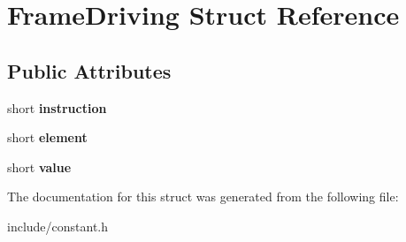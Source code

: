 \hypertarget{struct_frame_driving}{\section{\-Frame\-Driving \-Struct \-Reference}
\label{struct_frame_driving}
}
\subsection*{\-Public \-Attributes}
\begin{DoxyCompactItemize}
\item 
\hypertarget{struct_frame_driving_a4c0985fb401c923c8d3b526f69e7deb2}{short {\bfseries instruction}}\label{struct_frame_driving_a4c0985fb401c923c8d3b526f69e7deb2}

\item 
\hypertarget{struct_frame_driving_a669756480168eab7241bb8aabc6cd11a}{short {\bfseries element}}\label{struct_frame_driving_a669756480168eab7241bb8aabc6cd11a}

\item 
\hypertarget{struct_frame_driving_ae4c84259e78022daf4ef1bdaa0328b3c}{short {\bfseries value}}\label{struct_frame_driving_ae4c84259e78022daf4ef1bdaa0328b3c}

\end{DoxyCompactItemize}


\-The documentation for this struct was generated from the following file\-:\begin{DoxyCompactItemize}
\item 
include/constant.\-h\end{DoxyCompactItemize}
